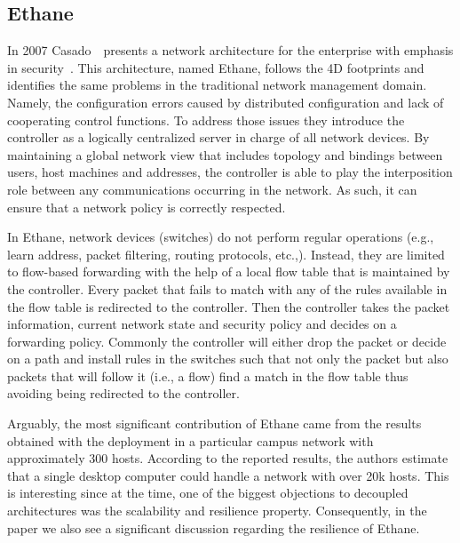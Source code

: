 \subsection{Ethane}
In 2007  Casado~\etal\ presents a network architecture for the enterprise with emphasis in security~\cite{Casado:2007kb}. 
This architecture, named Ethane, follows the 4D footprints and identifies the same problems in the traditional network management domain. Namely, the configuration errors caused by distributed configuration and lack of cooperating control functions. 
To address those issues they introduce the controller as a logically centralized server in charge of all network devices.
By maintaining a global network view that includes topology and  bindings between users, host machines and addresses, the controller is able to play the interposition role between any communications occurring in the network. As such, it can ensure that a network policy is correctly respected. 


In Ethane, network devices (switches) do not perform regular operations (e.g., learn address, packet filtering, routing protocols, etc.,).
Instead, they are limited  to flow-based forwarding with the help of a local flow table that is maintained by the controller.
Every packet that fails to match with any of the rules available in the flow table is redirected to the controller. Then the controller takes the packet information, current network state and security policy and decides on a forwarding policy. Commonly the controller will either drop the packet or decide on a path and install rules in the switches such that  not only the packet but also packets that will follow it (i.e., a flow) find a match in the flow table thus avoiding being redirected to the controller. 


Arguably, the most significant contribution of Ethane came from the results obtained with the deployment in a particular campus network with approximately 300 hosts. 
According to the reported results, the authors estimate that a single desktop computer could handle a network with over 20k hosts.  
This is interesting since at the time,  one of the biggest objections to decoupled architectures was the scalability and resilience property. 
Consequently, in the paper we also see a significant discussion regarding the resilience of Ethane. 

